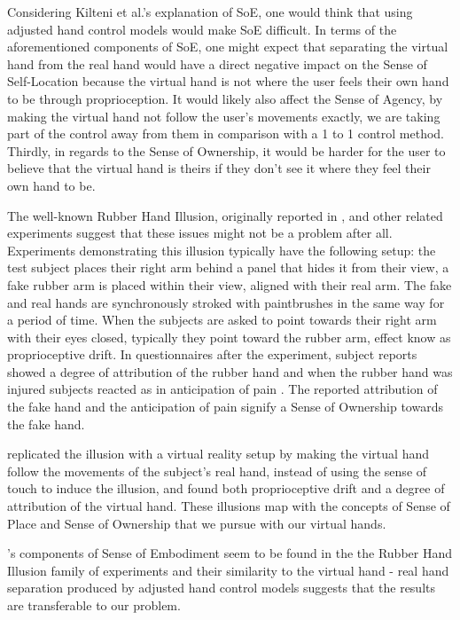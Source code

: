 Considering Kilteni et al.'s explanation of SoE, one would think that using adjusted hand control models would make SoE difficult. In terms of the aforementioned components of SoE, one might expect that separating the virtual hand from the real hand would have a direct negative impact on the Sense of Self-Location because the virtual hand is not where the user feels their own hand to be through proprioception. It would likely also affect the Sense of Agency, by making the virtual hand not follow the user's movements exactly, we are taking part of the control away from them in comparison with a 1 to 1 control method. Thirdly, in regards to the Sense of Ownership, it would be harder for the user to believe that the virtual hand is theirs if they don't see it where they feel their own hand to be.

The well-known Rubber Hand Illusion, originally reported in \parencite{Botvinick1998}, and other related experiments suggest that these issues might not be a problem after all. Experiments demonstrating this illusion typically have the following setup: the test subject places their right arm behind a panel that hides it from their view, a fake rubber arm is placed within their view, aligned with their real arm. The fake and real hands are synchronously stroked with paintbrushes in the same way for a period of time. When the subjects are asked to point towards their right arm with their eyes closed, typically they point toward the rubber arm, effect know as proprioceptive drift. In questionnaires after the experiment, subject reports showed a degree of attribution of the rubber hand \parencite{Botvinick1998} and when the rubber hand was injured subjects reacted as in anticipation of pain \parencite{Armel2003}. The reported attribution of the fake hand and the anticipation of pain signify a Sense of Ownership towards the fake hand.

\parencite{Sanchez-Vives2010} replicated the illusion with a virtual reality setup by making the virtual hand follow the movements of the subject's real hand, instead of using the sense of touch to induce the illusion, and found both proprioceptive drift and a degree of attribution of the virtual hand. These illusions map with the concepts of Sense of Place and Sense of Ownership that we pursue with our virtual hands.

\parencite{Kilteni2012}'s components of Sense of Embodiment seem to be found in the the Rubber Hand Illusion family of experiments and their similarity to the virtual hand - real hand separation produced by adjusted hand control models suggests that the results are transferable to our problem.


